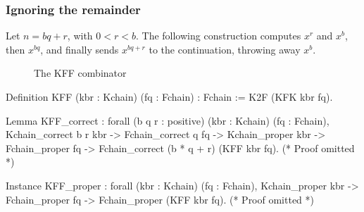 
\subsubsection{Ignoring the remainder}

Let $n=bq+r$, with $0<r<b$. The following construction computes
$x^r$ and $x^b$, then $x^{bq}$, and finally sends $x^{bq+r}$ to the continuation,
throwing away $x^b$.


\begin{figure}[h]
  \centering
  \caption{The KFF combinator}
  \label{fig:KFF}
\end{figure}



\begin{Coqsrc}
Definition KFF (kbr : Kchain) (fq : Fchain) : Fchain :=
  K2F (KFK kbr fq).

Lemma KFF_correct :
forall (b q r : positive) (kbr : Kchain) (fq : Fchain),
Kchain_correct  b r kbr ->
Fchain_correct q fq ->
Kchain_proper kbr ->
Fchain_proper fq -> Fchain_correct (b * q + r) (KFF kbr fq).
(* Proof omitted *)


Instance KFF_proper :
forall (kbr : Kchain) (fq : Fchain),
Kchain_proper kbr -> Fchain_proper fq -> Fchain_proper (KFF kbr fq).
(* Proof omitted *)
\end{Coqsrc}


